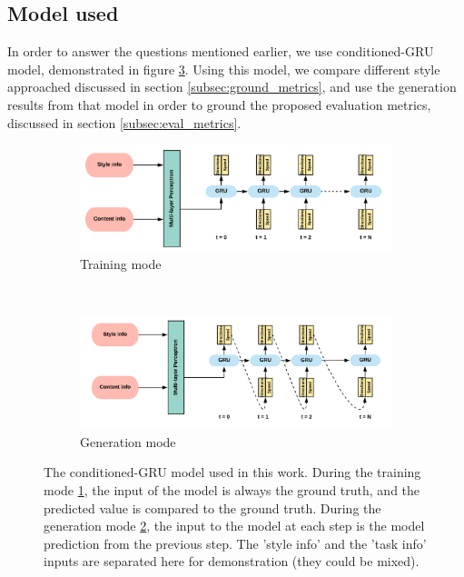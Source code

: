 \subsection{Model used}
In order to answer the questions mentioned earlier, we use conditioned-GRU model, demonstrated in figure \ref{fig:dtl_model}. Using this model, we compare different style approached discussed in section \ref{subsec:ground_metrics}, and use the generation results from that model in order to ground the proposed evaluation metrics, discussed in section \ref{subsec:eval_metrics}.
\begin{figure}[!htbp]
    \centering
    \begin{subfigure}[b]{\textwidth}
        \includegraphics[width=\textwidth]{images/gbem/dtl_training.png}
        \caption{Training mode}
        \label{subfig:dtl_training}
    \end{subfigure}
    ~
    \begin{subfigure}[b]{\textwidth}
        \includegraphics[width=\textwidth]{images/gbem/dtl_generation.png}
        \caption{Generation mode}
        \label{subfig:dtl_generation}
    \end{subfigure}

    \caption{The conditioned-GRU model used in this work. During the training mode \ref{subfig:dtl_training}, the input of the model is always the ground truth, and the predicted value is compared to the ground truth. During the generation mode \ref{subfig:dtl_generation}, the input to the model at each step is the model prediction from the previous step. The 'style info' and the 'task info' inputs are separated here for demonstration (they could be mixed).}
    \label{fig:dtl_model}
\end{figure}

